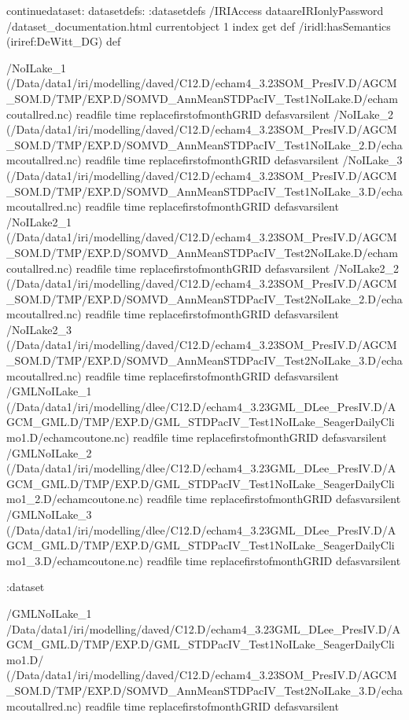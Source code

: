 \begin{ingrid}
continuedataset:
datasetdefs:
:datasetdefs
/IRIAccess dataareIRIonlyPassword
/dataset_documentation.html currentobject 1 index get def
/iridl:hasSemantics (iriref:DeWitt_DG) def
\end{ingrid}
/NoILake_1
{
(/Data/data1/iri/modelling/daved/C12.D/echam4_3.23SOM_PresIV.D/AGCM_SOM.D/TMP/EXP.D/SOMVD_AnnMeanSTDPacIV_Test1NoILake.D/echamcoutallred.nc) readfile
 time replacefirstofmonthGRID
} defasvarsilent
/NoILake_2
{
(/Data/data1/iri/modelling/daved/C12.D/echam4_3.23SOM_PresIV.D/AGCM_SOM.D/TMP/EXP.D/SOMVD_AnnMeanSTDPacIV_Test1NoILake_2.D/echamcoutallred.nc) readfile
 time replacefirstofmonthGRID
} defasvarsilent
/NoILake_3
{
(/Data/data1/iri/modelling/daved/C12.D/echam4_3.23SOM_PresIV.D/AGCM_SOM.D/TMP/EXP.D/SOMVD_AnnMeanSTDPacIV_Test1NoILake_3.D/echamcoutallred.nc) readfile
 time replacefirstofmonthGRID
} defasvarsilent
/NoILake2_1
{
(/Data/data1/iri/modelling/daved/C12.D/echam4_3.23SOM_PresIV.D/AGCM_SOM.D/TMP/EXP.D/SOMVD_AnnMeanSTDPacIV_Test2NoILake.D/echamcoutallred.nc) readfile
 time replacefirstofmonthGRID
} defasvarsilent
/NoILake2_2
{
(/Data/data1/iri/modelling/daved/C12.D/echam4_3.23SOM_PresIV.D/AGCM_SOM.D/TMP/EXP.D/SOMVD_AnnMeanSTDPacIV_Test2NoILake_2.D/echamcoutallred.nc) readfile
 time replacefirstofmonthGRID
} defasvarsilent
/NoILake2_3
{
(/Data/data1/iri/modelling/daved/C12.D/echam4_3.23SOM_PresIV.D/AGCM_SOM.D/TMP/EXP.D/SOMVD_AnnMeanSTDPacIV_Test2NoILake_3.D/echamcoutallred.nc) readfile
 time replacefirstofmonthGRID
} defasvarsilent
/GMLNoILake_1
{ (/Data/data1/iri/modelling/dlee/C12.D/echam4_3.23GML_DLee_PresIV.D/AGCM_GML.D/TMP/EXP.D/GML_STDPacIV_Test1NoILake_SeagerDailyClimo1.D/echamcoutone.nc) readfile
 time replacefirstofmonthGRID
} defasvarsilent
/GMLNoILake_2
{ (/Data/data1/iri/modelling/dlee/C12.D/echam4_3.23GML_DLee_PresIV.D/AGCM_GML.D/TMP/EXP.D/GML_STDPacIV_Test1NoILake_SeagerDailyClimo1_2.D/echamcoutone.nc) readfile
 time replacefirstofmonthGRID
} defasvarsilent
/GMLNoILake_3
{ (/Data/data1/iri/modelling/dlee/C12.D/echam4_3.23GML_DLee_PresIV.D/AGCM_GML.D/TMP/EXP.D/GML_STDPacIV_Test1NoILake_SeagerDailyClimo1_3.D/echamcoutone.nc) readfile
 time replacefirstofmonthGRID
} defasvarsilent
\begin{ingrid}
:dataset
\end{ingrid}
/GMLNoILake_1
{
/Data/data1/iri/modelling/daved/C12.D/echam4_3.23GML_DLee_PresIV.D/AGCM_GML.D/TMP/EXP.D/GML_STDPacIV_Test1NoILake_SeagerDailyClimo1.D/
(/Data/data1/iri/modelling/daved/C12.D/echam4_3.23SOM_PresIV.D/AGCM_SOM.D/TMP/EXP.D/SOMVD_AnnMeanSTDPacIV_Test2NoILake_3.D/echamcoutallred.nc) readfile
 time replacefirstofmonthGRID
} defasvarsilent

